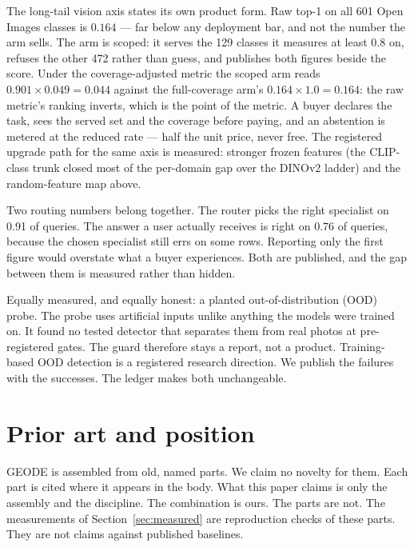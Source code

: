 \documentclass[11pt]{article}
\begin{document}
The long-tail vision axis states its own product form. Raw top-1
on all 601 Open Images classes is $0.164$ --- far below any
deployment bar, and not the number the arm sells. The arm is
scoped: it serves the 129 classes it measures at least $0.8$ on,
refuses the other 472 rather than guess, and publishes both
figures beside the score. Under the coverage-adjusted metric the
scoped arm reads $0.901 \times 0.049 = 0.044$ against the
full-coverage arm's $0.164 \times 1.0 = 0.164$: the raw metric's
ranking inverts, which is the point of the metric. A buyer
declares the task, sees the served set and the coverage before
paying, and an abstention is metered at the reduced rate --- half
the unit price, never free. The registered upgrade path
for the same axis is measured: stronger frozen features (the
CLIP-class trunk closed most of the per-domain gap over the
DINOv2 ladder) and the random-feature map above.

Two routing numbers belong together. The router picks the right
specialist on 0.91 of queries. The answer a user actually
receives is right on 0.76 of queries, because the chosen
specialist still errs on some rows. Reporting only the first
figure would overstate what a buyer experiences. Both are
published, and the gap between them is measured rather than
hidden.

Equally measured, and equally honest: a planted
out-of-distribution (OOD) probe. The probe uses artificial inputs
unlike anything the models were trained on. It found no tested
detector that separates them from real photos at pre-registered
gates. The guard therefore stays a report, not a product.
Training-based OOD detection is a registered research direction.
We publish the failures with the successes. The ledger makes both
unchangeable.

\section{Prior art and position}

GEODE is assembled from old, named parts. We claim no novelty for
them. Each part is cited where it appears in the body. What this
paper claims is only the assembly and the discipline. The
combination is ours. The parts are not. The measurements of
Section~\ref{sec:measured} are reproduction checks of these parts.
They are not claims against published baselines.
\end{document}
